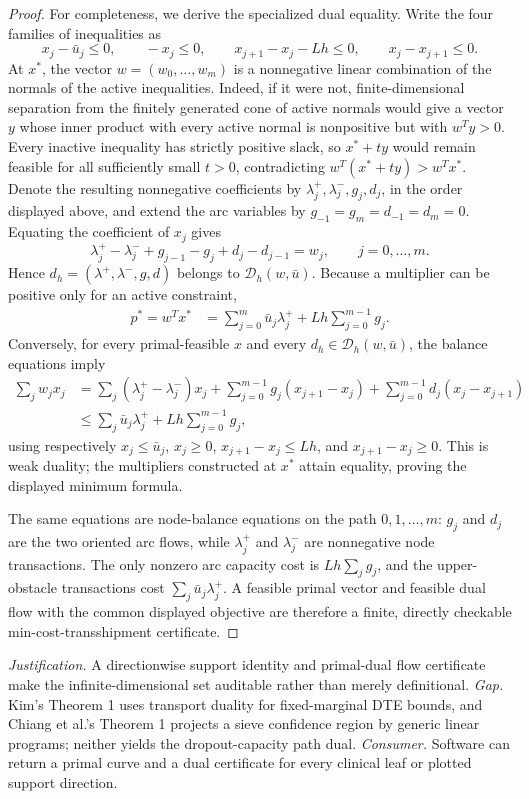 \documentclass{article}
\begin{document}
\begin{proof}
For completeness, we derive the specialized dual equality.  Write the four
families of inequalities as
\[
 x_j-\bar u_j\le0,\qquad -x_j\le0,\qquad
 x_{j+1}-x_j-Lh\le0,\qquad x_j-x_{j+1}\le0.
\]
At \(x^*\), the vector \(w=(w_0,\ldots,w_m)\) is a nonnegative linear
combination of the normals of the active inequalities.  Indeed, if it were
not, finite-dimensional separation from the finitely generated cone of
active normals would give a vector \(y\) whose inner product with every
active normal is nonpositive but with \(w^Ty>0\).  Every inactive inequality
has strictly positive slack, so \(x^*+ty\) would remain feasible for all
sufficiently small \(t>0\), contradicting
\(w^T(x^*+ty)>w^Tx^*\).  Denote the resulting nonnegative coefficients by
\(\lambda_j^+,\lambda_j^-,g_j,d_j\), in the order displayed above, and
extend the arc variables by
\(g_{-1}=g_m=d_{-1}=d_m=0\).  Equating the coefficient of \(x_j\) gives
\[
 \lambda_j^+-\lambda_j^-+g_{j-1}-g_j+d_j-d_{j-1}=w_j,
 \qquad j=0,\ldots,m.
\]
Hence \(d_h=(\lambda^+,\lambda^-,g,d)\) belongs to
\(\mathcal D_h(w,\bar u)\).  Because a multiplier can be positive only for
an active constraint,
\[
\begin{aligned}
p^*=w^Tx^*
 &=\sum_{j=0}^m\bar u_j\lambda_j^+
   +Lh\sum_{j=0}^{m-1}g_j.
\end{aligned}
\]
Conversely, for every primal-feasible \(x\) and every
\(d_h\in\mathcal D_h(w,\bar u)\), the balance equations imply
\[
\begin{aligned}
\sum_jw_jx_j
&=\sum_j(\lambda_j^+-\lambda_j^-)x_j
 +\sum_{j=0}^{m-1}g_j(x_{j+1}-x_j)
 +\sum_{j=0}^{m-1}d_j(x_j-x_{j+1})\\
&\le \sum_j\bar u_j\lambda_j^+
       +Lh\sum_{j=0}^{m-1}g_j,
\end{aligned}
\]
using respectively \(x_j\le\bar u_j\), \(x_j\ge0\),
\(x_{j+1}-x_j\le Lh\), and \(x_{j+1}-x_j\ge0\).  This is weak duality;
the multipliers constructed at \(x^*\) attain equality, proving the displayed
minimum formula.

The same equations are node-balance equations on the path
\(0,1,\ldots,m\): \(g_j\) and \(d_j\) are the two oriented arc flows, while
\(\lambda_j^+\) and \(\lambda_j^-\) are nonnegative node transactions.
The only nonzero arc capacity cost is \(Lh\sum_jg_j\), and the upper-obstacle
transactions cost \(\sum_j\bar u_j\lambda_j^+\).  A feasible primal vector
and feasible dual flow with the common displayed objective are therefore a
finite, directly checkable min-cost-transshipment certificate.
\end{proof}
\par\smallskip\noindent \textit{Justification.} A directionwise support identity and primal-dual flow certificate make the infinite-dimensional set auditable rather than merely definitional. \textit{Gap.} Kim's Theorem 1 uses transport duality for fixed-marginal DTE bounds, and Chiang et al.'s Theorem 1 projects a sieve confidence region by generic linear programs; neither yields the dropout-capacity path dual. \textit{Consumer.} Software can return a primal curve and a dual certificate for every clinical leaf or plotted support direction.
\end{document}

